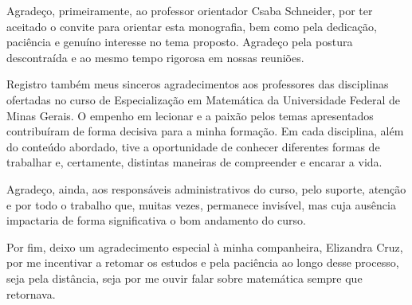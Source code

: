   


\begin{agradecimentos}

Agradeço, primeiramente, ao professor orientador Csaba Schneider, por ter aceitado
o convite para orientar esta monografia, bem como pela dedicação, paciência e
genuíno interesse no tema proposto. Agradeço pela postura descontraída e ao mesmo 
tempo rigorosa em nossas reuniões.

Registro também meus sinceros agradecimentos aos professores das disciplinas
ofertadas no curso de Especialização em Matemática da Universidade Federal de
Minas Gerais. O empenho em lecionar e a paixão pelos temas apresentados
contribuíram de forma decisiva para a minha formação. Em cada disciplina, além
do conteúdo abordado, tive a oportunidade de conhecer diferentes formas de
trabalhar e, certamente, distintas maneiras de compreender e encarar a vida.

Agradeço, ainda, aos responsáveis administrativos do curso, pelo suporte,
atenção e por todo o trabalho que, muitas vezes, permanece invisível, mas cuja
ausência impactaria de forma significativa o bom andamento do curso.

Por fim, deixo um agradecimento especial à minha companheira, Elizandra Cruz,
por me incentivar a retomar os estudos e pela paciência ao longo desse processo,
seja pela distância, seja por me ouvir falar sobre matemática sempre que retornava.

\end{agradecimentos}



